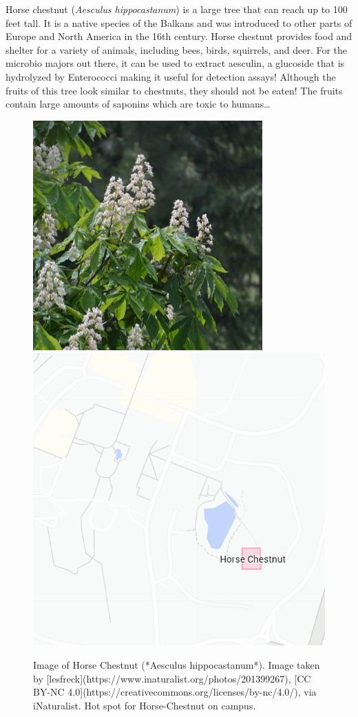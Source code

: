 \documentclass[
]{book}
\begin{document}
Horse chestnut (\emph{Aesculus hippocastanum}) is a large tree that can reach up to 100 feet tall. It is a native species of the Balkans and was introduced to other parts of Europe and North America in the 16th century. Horse chestnut provides food and shelter for a variety of animals, including bees, birds, squirrels, and deer. For the microbio majors out there, it can be used to extract aesculin, a glucoside that is hydrolyzed by Enterococci making it useful for detection assays! Although the fruits of this tree look similar to chestnuts, they should not be eaten! The fruits contain large amounts of saponins which are toxic to humans\ldots{}

\begin{figure}

{\centering \includegraphics[width=0.49\linewidth,height=0.2\textheight]{plant_images/horse_c_11} \includegraphics[width=0.49\linewidth,height=0.2\textheight]{plant_images/horse_c_hotspot_11} 

}

\caption{Image of Horse Chestnut (*Aesculus hippocastanum*). Image taken by [lesfreck](https://www.inaturalist.org/photos/201399267), [CC BY-NC 4.0](https://creativecommons.org/licenses/by-nc/4.0/), via iNaturalist. Hot spot for Horse-Chestnut on campus.}\label{fig:unnamed-chunk-11}
\end{figure}
\end{document}
